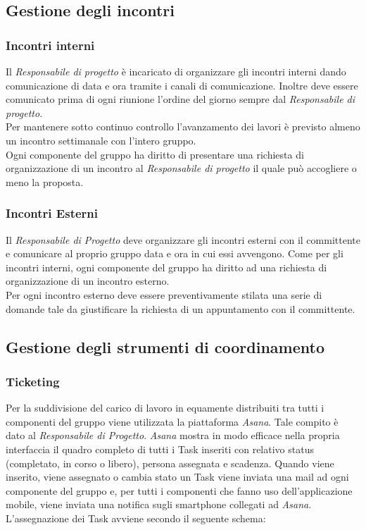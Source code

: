 \documentclass[./../NomeDocumento.tex]{subfiles}
\begin{document}
	\subsection{Gestione degli incontri}
	
	\subsubsection{Incontri interni}
	
	Il \textit{Responsabile di progetto} è incaricato di organizzare gli incontri interni dando comunicazione di data e ora tramite i canali di comunicazione. Inoltre deve essere comunicato prima di ogni riunione l'ordine del giorno sempre dal \textit{Responsabile di progetto}.
	\\ \noindent Per mantenere sotto continuo controllo l'avanzamento dei lavori è previsto almeno un incontro settimanale con l'intero gruppo.
	\\ \noindent Ogni componente del gruppo ha diritto di presentare una richiesta di organizzazione di un incontro al \textit{Responsabile di progetto} il quale può accogliere o meno la proposta.
	
	\subsubsection{Incontri Esterni}
	
	Il \textit{Responsabile di Progetto} deve organizzare gli incontri esterni con il committente e comunicare al proprio gruppo data e ora in cui essi avvengono. Come per gli incontri interni, ogni componente del gruppo ha diritto ad una richiesta di organizzazione di un incontro esterno.
	\\ \noindent Per ogni incontro esterno deve essere preventivamente stilata una serie di domande tale da giustificare la richiesta di un appuntamento con il committente.
	
	\subsection{Gestione degli strumenti di coordinamento}
	
	\subsubsection{Ticketing}
	
	Per la suddivisione del carico di lavoro in  equamente distribuiti tra tutti i componenti del gruppo viene utilizzata la piattaforma \textit{Asana}. Tale compito è dato al \textit{Responsabile di Progetto}. \textit{Asana} mostra in modo efficace nella propria interfaccia il quadro completo di tutti i Task inseriti con relativo status (completato, in corso o libero), persona assegnata e scadenza. Quando viene inserito, viene assegnato o cambia stato un Task viene inviata una mail ad ogni componente del gruppo e, per tutti i componenti che fanno uso dell'applicazione mobile, viene inviata una notifica sugli smartphone collegati ad \textit{Asana}.
	\\ \noindent L'assegnazione dei Task avviene secondo il seguente schema:
	
\end{document}
